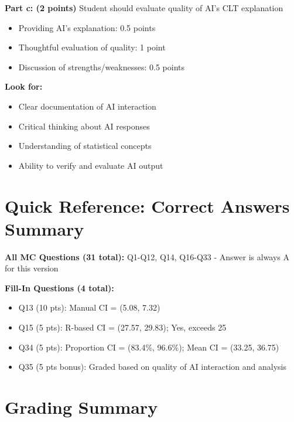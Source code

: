 \documentclass[11pt]{article}
\begin{document}
\textbf{Part c: (2 points)} Student should evaluate quality of AI's CLT explanation
\begin{itemize}
\item Providing AI's explanation: 0.5 points
\item Thoughtful evaluation of quality: 1 point
\item Discussion of strengths/weaknesses: 0.5 points
\end{itemize}

\textbf{Look for:}
\begin{itemize}
\item Clear documentation of AI interaction
\item Critical thinking about AI responses
\item Understanding of statistical concepts
\item Ability to verify and evaluate AI output
\end{itemize}

\newpage

\section*{Quick Reference: Correct Answers Summary}

\textbf{All MC Questions (31 total):} Q1-Q12, Q14, Q16-Q33 - Answer is always \textcolor{correctgreen}{A} for this version

\textbf{Fill-In Questions (4 total):}
\begin{itemize}
\item Q13 (10 pts): Manual CI = (5.08, 7.32)
\item Q15 (5 pts): R-based CI = (27.57, 29.83); Yes, exceeds 25
\item Q34 (5 pts): Proportion CI = (83.4\%, 96.6\%); Mean CI = (33.25, 36.75)
\item Q35 (5 pts bonus): Graded based on quality of AI interaction and analysis
\end{itemize}

\section*{Grading Summary}
\end{document}
